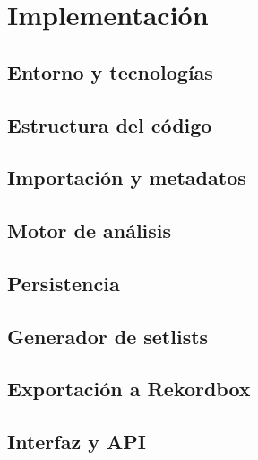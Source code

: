 
\chapter{Implementación}
\label{cha:implementacion}

\section{Entorno y tecnologías}
\label{sec:imp-entorno}


\section{Estructura del código}
\label{sec:imp-estructura}


\section{Importación y metadatos}
\label{sec:imp-importacion}


\section{Motor de análisis}
\label{sec:imp-analisis}


\section{Persistencia}
\label{sec:imp-persistencia}


\section{Generador de setlists}
\label{sec:imp-generador}


\section{Exportación a Rekordbox}
\label{sec:imp-exportacion}


\section{Interfaz y API}
\label{sec:imp-interfaz}











